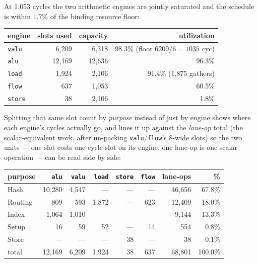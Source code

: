 \documentclass[11pt]{article}
\newcommand{\code}[1]{\texttt{#1}}
\begin{document}
At 1{,}053 cycles the two arithmetic engines are jointly saturated and the
schedule is within $1.7\%$ of the binding resource floor:

\begin{center}
\begin{tabular}{lrrr}
\toprule
engine & slots used & capacity & utilization \\
\midrule
\code{valu}  & 6{,}209  & 6{,}318  & 98.3\% (floor $6209/6 = 1035$ cyc) \\
\code{alu}   & 12{,}169 & 12{,}636 & 96.3\% \\
\code{load}  & 1{,}924  & 2{,}106  & 91.4\% (1{,}875 gathers) \\
\code{flow}  & 637      & 1{,}053  & 60.5\% \\
\code{store} & 38       & 2{,}106  & 1.8\% \\
\bottomrule
\end{tabular}
\end{center}

\noindent Splitting that same slot count by \emph{purpose} instead of just
by engine shows where each engine's cycles actually go, and lines it up
against the \emph{lane-op} total (the scalar-equivalent work, after
un-packing \code{valu}/\code{flow}'s 8-wide slots) so the two units --- one
slot costs one cycle-slot on its engine, one lane-op is one scalar
operation --- can be read side by side:

\begin{center}
\begin{tabular}{lrrrrrrr}
\toprule
purpose & \code{alu} & \code{valu} & \code{load} & \code{store} & \code{flow} & lane-ops & \% \\
\midrule
Hash    & 10{,}280 & 4{,}547 & ---     & ---   & ---   & 46{,}656 & 67.8\% \\
Routing &    809   &   593   & 1{,}872 & ---   & 623   & 12{,}409 & 18.0\% \\
Index   &  1{,}064 & 1{,}010 & ---     & ---   & ---   &  9{,}144 & 13.3\% \\
Setup   &     16   &    59   &    52   & ---   &  14   &    554  &  0.8\% \\
Store   &    ---   &   ---   &   ---   &  38   & ---   &     38  &  0.1\% \\
\midrule
total   & 12{,}169 & 6{,}209 & 1{,}924 &  38   & 637   & 68{,}801 & 100.0\% \\
\bottomrule
\end{tabular}
\end{center}
\end{document}
